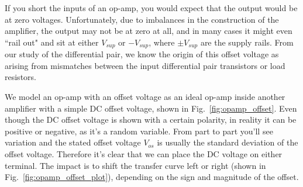 If you short the inputs of an op-amp, you would expect that the output would be at zero voltages.  Unfortunately, due to imbalances in the construction of the amplifier, the output may not be at zero at all, and in many cases it might even ``rail out" and sit at either $V_{sup}$ or $-V_{sup}$, where $\pm V_{sup}$ are the supply rails.  From our study of the differential pair, we know the origin of this offset voltage as arising from mismatches between the input differential pair transistors or load resistors.  

We model an op-amp with an offset voltage as an ideal op-amp inside another amplifier with a simple DC offset voltage, shown in Fig.~\ref{fig:opamp_offset}.  Even though the DC offset voltage is shown with a certain polarity, in reality it can be positive or negative, as it's a random variable.  From part to part you'll see variation and the stated offset voltage $V_{os}$ is usually the standard deviation of the offset voltage.  Therefore it's clear that we can place the DC voltage on either terminal.  The impact is to shift the transfer curve left or right (shown in Fig.~\ref{fig:opamp_offset_plot}), depending on the sign and magnitude of the offset.
